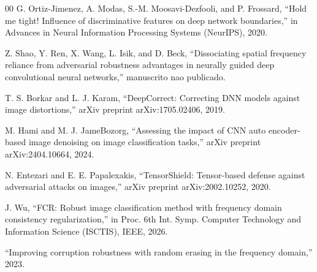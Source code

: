 \documentclass[conference]{IEEEtran}
\begin{document}
\begin{thebibliography}{00}
 G. Ortiz-Jimenez, A. Modas, S.-M. Moosavi-Dezfooli, and P.
Frossard, ``Hold me tight! Influence of discriminative features on deep network
boundaries,'' in Advances in Neural Information Processing Systems (NeurIPS),
2020.

 Z. Shao, Y. Ren, X. Wang, L. Isik, and D. Beck, ``Dissociating
spatial frequency reliance from adversarial robustness advantages in neurally
guided deep convolutional neural networks,'' manuscrito nao publicado.

 T. S. Borkar and L. J. Karam, ``DeepCorrect: Correcting DNN
models against image distortions,'' arXiv preprint arXiv:1705.02406, 2019.

 M. Hami and M. J. JameBozorg, ``Assessing the impact of CNN auto
encoder-based image denoising on image classification tasks,'' arXiv preprint
arXiv:2404.10664, 2024.

 N. Entezari and E. E. Papalexakis, ``TensorShield: Tensor-based
defense against adversarial attacks on images,'' arXiv preprint
arXiv:2002.10252, 2020.

 J. Wu, ``FCR: Robust image classification method with frequency
domain consistency regularization,'' in Proc. 6th Int. Symp. Computer
Technology and Information Science (ISCTIS), IEEE, 2026.

 ``Improving corruption robustness with random erasing in the
frequency domain,'' 2023.

\end{thebibliography}
\end{document}
